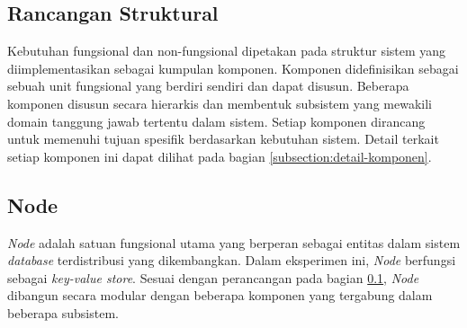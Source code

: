 \subsection{Rancangan Struktural}
\label{subsection:rancangan-struktural}

Kebutuhan fungsional dan non-fungsional dipetakan pada struktur sistem yang diimplementasikan sebagai kumpulan komponen. Komponen didefinisikan sebagai sebuah unit fungsional yang berdiri sendiri dan dapat disusun. Beberapa komponen disusun secara hierarkis dan membentuk subsistem yang mewakili domain tanggung jawab tertentu dalam sistem. Setiap komponen dirancang untuk memenuhi tujuan spesifik berdasarkan kebutuhan sistem. Detail terkait setiap komponen ini dapat dilihat pada bagian \ref{subsection:detail-komponen}.

\subsection{Node}
\label{subsection:node}

\textit{Node} adalah satuan fungsional utama yang berperan sebagai entitas dalam sistem \textit{database} terdistribusi yang dikembangkan. Dalam eksperimen ini, \textit{Node} berfungsi sebagai \textit{key-value store}. Sesuai dengan perancangan pada bagian \ref{subsection:rancangan-struktural}, \textit{Node} dibangun secara modular dengan beberapa komponen yang tergabung dalam beberapa subsistem.



